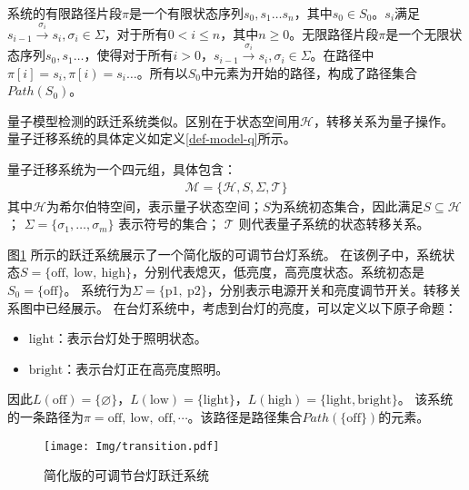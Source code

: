 系统的有限路径片段\(\pi\)是一个有限状态序列\(s_0,s_1\ldots s_n\)，其中\(s_0\in S_0\)。\(s_i\)满足\(s_{i-1}\overset{\sigma_i}{\rightarrow}s_i,\sigma_i\in \Sigma\)，对于所有\(0<i\leq n\)，其中\(n\geq 0 \)。无限路径片段\(\pi\)是一个无限状态序列\(s_0,s_1\ldots\)，使得对于所有\(i>0\)，\(s_{i-1} \overset{\sigma_i}{\rightarrow}  s_i,\sigma_i\in \Sigma\)。在路径中\(\pi\left[i\right]=s_i,\pi\left[i\right)=s_i\ldots\)。所有以\(S_0\)中元素为开始的路径，构成了路径集合\(Path\left(S_0\right)\)。

量子模型检测的跃迁系统类似。区别在于状态空间用\(\mathcal{H}\)，转移关系为量子操作。量子迁移系统的具体定义如定义\ref{def-model-q}所示。
\begin{definition}\citep{2021}
    \label{def-model-q}
    量子迁移系统为一个四元组，具体包含：
    \begin{align}
        \mathcal{M}=\{\mathcal{H},S,\Sigma,\mathcal{T}\}
    \end{align}
    其中\(\mathcal{H}\)为希尔伯特空间，表示量子状态空间；\(S\)为系统初态集合，因此满足\(S\subseteq \mathcal{H}\)； $\Sigma=\{\sigma_1,\ldots,\sigma_m\}$ 表示符号的集合； $\mathcal{T}$ 则代表量子系统的状态转移关系。
\end{definition}
\begin{example}
    \label{ex-transition}
    图\ref{fig:transition-system} 所示的跃迁系统展示了一个简化版的可调节台灯系统。
    在该例子中，系统状态\(S=\{\text{off},\ \text{low},\ \text{high}\}\)，分别代表熄灭，低亮度，高亮度状态。系统初态是\(S_0 = \{\text{off}\}\)。
    系统行为\(\Sigma=\{\text{p1},\ \text{p2}\}\)，分别表示电源开关和亮度调节开关。转移关系图中已经展示。
    在台灯系统中，考虑到台灯的亮度，可以定义以下原子命题：
\begin{itemize}
    \item \(\text{light}\)：表示台灯处于照明状态。
    \item \(\text{bright}\)：表示台灯正在高亮度照明。
\end{itemize}
因此\(L\left(\text{off}  \right)=\{\varnothing\}\)，\(L\left(\text{low}\right)=\{\text{light}\}\)，\(L\left(\text{high}  \right)=\{\text{light},\text{bright}\}\)。
该系统的一条路径为\(\pi = \text{off},\ \text{low}, \ \text{off}, \cdots  \)。该路径是路径集合\(Path(\{\text{off}\})\)的元素。
    \begin{figure}[!htbp]
        \centering
        \texttt{[image: Img/transition.pdf]}
        \caption{简化版的可调节台灯跃迁系统}
        \label{fig:transition-system}
    \end{figure}
\end{example}

